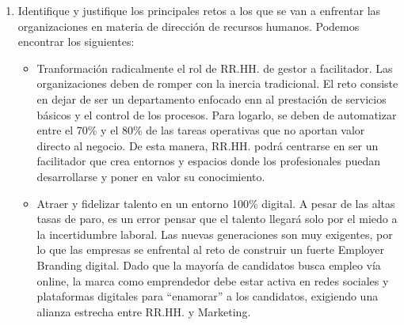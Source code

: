\documentclass[12pt]{book} %
\begin{document}
\begin{enumerate}
\begin{itemize}
        \item Fomentar el aprendizaje cruzado y el mentoring intergeneracional. Se puede proponer instaurar programas donde los empleados más jóvenes enseñen el uso de las nuevas tecnologías a los veteranos, mientras que los profesionales con más antigüedad pueden compartir su conocimiento de negocio y experiencia con los más jóvenes.
        \item Promover la co-creación mediante la escucha activa. Por ejemplo, realizando encuestas periódicas para conocer las preferencias.
        \item Impulsar la flexibilidad laborar y erradicar el presentismo. Fomentando el teletrabajo que hemos tratado en la asignatura y facilitar la formación virtual. 
        \item Gestionar activamente la brecha motivacional. Con la responsabilidad de acompañar a los más profesionales más veteranos para que desarrollen su automotivación y no se queden estancados del nuevo entorno digital. Se debe de gestionar, simultáneamente, la rápida frustración y el aburrimiento de los jóvenes.
        \item Generar cohesión a través de experiencias compartidas de RSC. Fomentar lap participación conjunta en causas de Resposabilidad Social Corporativa, ayudándose así a difuminar las barreras de la edad. Este tipo de actividades refuerzan enormemente el orgullo de pertenencia, la cohesión y el trabajo en equipo sin requerir grandes inversiones económicas.
    \end{itemize}
    \item Identifique y justifique los principales retos a los que se van a enfrentar las organizaciones en materia de dirección de recursos humanos.
    Podemos encontrar los siguientes:
    \begin{itemize}
        \item Tranformación radicalmente el rol de RR.HH. de gestor a facilitador. Las organizaciones deben de romper con la inercia tradicional. El reto consiste en dejar de ser un departamento enfocado enn al prestación de servicios básicos y el control de los procesos. Para logarlo, se deben de automatizar entre el 70\% y el 80\% de las tareas operativas que no aportan valor directo al negocio. De esta manera, RR.HH. podrá centrarse en ser un facilitador que crea entornos y espacios donde los profesionales puedan desarrollarse y poner en valor su conocimiento.
        \item Atraer y fidelizar talento en un entorno 100\% digital. A pesar de las altas tasas de paro, es un error pensar que el talento llegará solo por el miedo a la incertidumbre laboral. Las nuevas generaciones son muy exigentes, por lo que las empresas se enfrental al reto de construir un fuerte Employer Branding digital. Dado que la mayoría de candidatos busca empleo vía online, la marca como emprendedor debe estar activa en redes sociales y plataformas digitales para ``enamorar'' a los candidatos, exigiendo una alianza estrecha entre RR.HH. y Marketing.

\end{itemize}
\end{enumerate}
\end{document}
